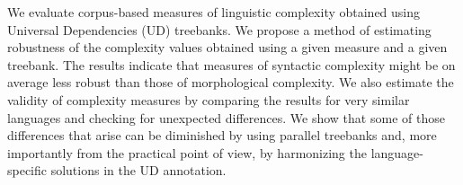 We evaluate corpus-based measures of linguistic complexity obtained using Universal Dependencies (UD) treebanks. We propose a method of estimating robustness of the complexity values obtained using a given measure and a given treebank. The results indicate that measures of syntactic complexity might be on average less robust than those of morphological complexity. We also estimate the validity of complexity measures by comparing the results for very similar languages and checking for unexpected differences. We show that some of those differences that arise can be diminished by using parallel treebanks and, more importantly from the practical point of view, by harmonizing the language-specific solutions in the UD annotation.
